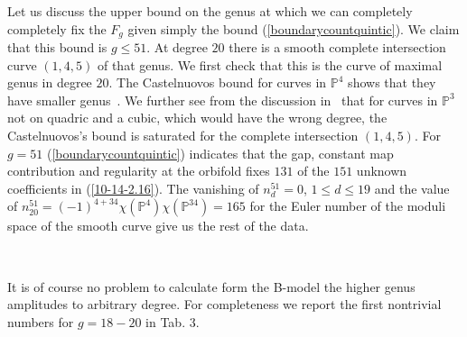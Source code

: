 \documentclass[12pt]{article}
\begin{document}
Let us discuss the upper bound on the genus at which we can
completely completely fix the $F_g$ given simply the bound
(\ref{boundarycountquintic}). We claim that this bound is  $g\le
51$. At degree $20$ there is a smooth complete intersection curve
$(1,4,5)$ of that genus. We first check that this is the curve of
maximal genus in degree $20$. The Castelnuovos bound for curves in
$\mathbb{P}^4$ shows that they have smaller genus~\cite{Harris}.
We further see from the discussion in~\cite{Harris} that for
curves in $\mathbb{P}^3$ not on quadric and a cubic, which would
have the wrong degree, the Castelnuovos's bound is saturated for
the complete intersection  $(1,4,5)$. For $g=51$
(\ref{boundarycountquintic}) indicates that the gap, constant map
contribution  and regularity at the orbifold fixes $131$ of the
$151$ unknown coefficients in  (\ref{10-14-2.16}). The vanishing
of $n^{51}_{d}=0$, $1\le d\le 19$ and the value of
$n^{51}_{20}=(-1)^{ 4+ 34}
\chi(\mathbb{P}^4)\chi(\mathbb{P}^{34}) =165$ for the Euler number
of the moduli space of the smooth curve give us the rest of the
data.

\parbox{14cm} %
{

   \begin{center}
   \mbox{
}
   \end{center}
}
%
\vskip -2mm
\vskip 2mm


It is of course no problem to calculate  form the B-model the
higher genus amplitudes to arbitrary degree. For completeness we
report the first nontrivial numbers for $g=18-20$ in Tab. 3.
\end{document}
